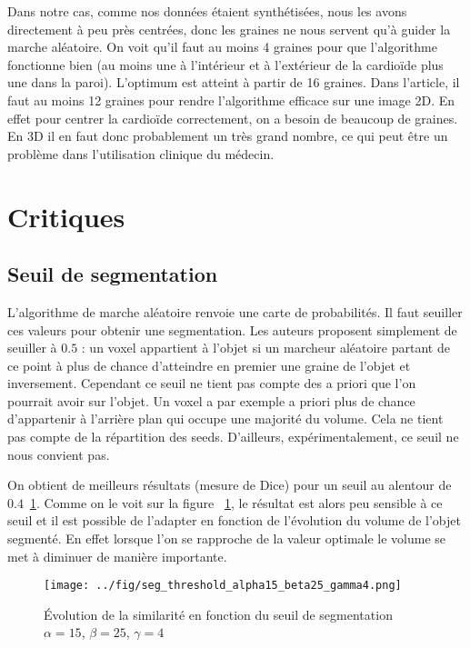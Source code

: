 \documentclass{article}
\begin{document}
Dans notre cas, comme nos données étaient synthétisées, nous les avons directement à peu près centrées, donc les graines ne nous servent qu’à guider la marche aléatoire. On voit qu’il faut au moins 4 graines pour que l’algorithme fonctionne bien (au moins une à l’intérieur et à l’extérieur de la cardioïde plus une dans la paroi). L’optimum est atteint à partir de 16 graines. Dans l’article, il faut au moins 12 graines pour rendre l’algorithme efficace sur une image 2D. En effet pour centrer la cardioïde correctement, on a besoin de beaucoup de graines. En 3D il en faut donc probablement un très grand nombre, ce qui peut être un problème dans l’utilisation clinique du médecin.


\clearpage

\section{Critiques}


\subsection{Seuil de segmentation}

L'algorithme de marche aléatoire renvoie une carte de probabilités. Il faut seuiller ces valeurs pour obtenir une segmentation. Les auteurs proposent simplement de seuiller à $0.5$ : un voxel appartient à l'objet si un marcheur aléatoire partant de ce point à plus de chance d'atteindre en premier une graine de l'objet et inversement. Cependant ce seuil ne tient pas compte des a priori que l'on pourrait avoir sur l'objet. Un voxel a par exemple a priori plus de chance d'appartenir à l'arrière plan qui occupe une majorité du volume. Cela ne tient pas compte de la répartition des seeds. D'ailleurs, expérimentalement, ce seuil ne nous convient pas. 

On obtient de meilleurs résultats (mesure de Dice) pour un seuil au alentour de $0.4$~\ref{fig:seg_threshold}. Comme on le voit sur la figure ~\ref{fig:seg_threshold}, le résultat est alors peu sensible à ce seuil et il est possible de l'adapter en fonction de l'évolution du volume de l'objet segmenté. En effet lorsque l'on se rapproche de la valeur optimale le volume se met à diminuer de manière importante.

\begin{figure}[h!]
  \begin{center}
    \caption{Évolution de la similarité en fonction du seuil de segmentation $\alpha=15$, $\beta=25$, $\gamma=4$}
    \texttt{[image: ../fig/seg\_threshold\_alpha15\_beta25\_gamma4.png]}
    \label{fig:seg_threshold}
  \end{center}
\end{figure}
\end{document}

